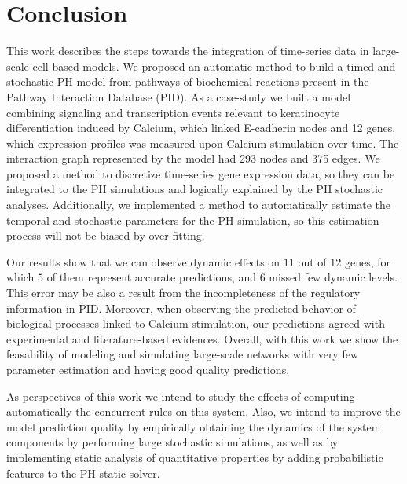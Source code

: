 \section{Conclusion}
This work describes the steps towards the integration of time-series data in large-scale cell-based models. 
We proposed an automatic method to build a timed and stochastic PH model from pathways of biochemical reactions present in 
the Pathway Interaction Database (PID). 
%
As a case-study we built a model combining signaling and transcription events relevant to keratinocyte differentiation induced by Calcium, which linked E-cadherin nodes and 12 genes, which 
expression profiles was measured upon Calcium stimulation over time. The interaction graph represented by the model had 293 nodes and 375 edges.
%
We proposed a method to discretize time-series gene expression data, so they can be integrated to the PH simulations and logically explained by the PH stochastic analyses. 
%
Additionally, we implemented a method to automatically estimate the temporal and stochastic
parameters for the PH simulation, so this estimation process will not be biased by over fitting. 
%

Our results show that  we can observe dynamic effects on $11$ out of $12$ genes, for which $5$ of them represent accurate predictions, and $6$ missed few dynamic levels.
This error may be also a result from the incompleteness of the regulatory information in PID.
Moreover, when observing the predicted behavior of biological processes linked to Calcium stimulation, our predictions agreed with experimental and literature-based evidences.
Overall, with this work we show the feasability of modeling and simulating large-scale networks with very few parameter estimation 
and having good quality predictions.

As perspectives of this work we intend to study the effects of computing automatically the concurrent rules on this system.
Also, we intend to improve the model prediction quality by empirically obtaining the dynamics of the system components by performing large stochastic simulations, as well 
as by implementing static analysis of quantitative properties by adding probabilistic features to the PH static solver.

